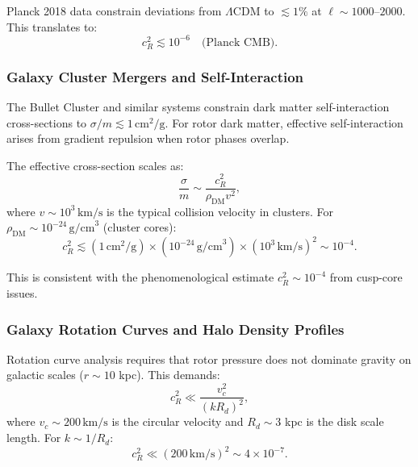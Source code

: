 \documentclass[11pt,a4paper]{article}
\numberwithin{equation}{section}
\theoremstyle{plain}
\theoremstyle{definition}
\theoremstyle{remark}
\begin{document}
Planck 2018 data constrain deviations from $\Lambda$CDM to $\lesssim 1\%$ at $\ell \sim 1000$--$2000$. This translates to:
\begin{equation}
c_R^2 \lesssim 10^{-6} \quad\text{(Planck CMB)}.
\label{eq:cmb-constraint}
\end{equation}

\subsubsection{Galaxy Cluster Mergers and Self-Interaction}

The Bullet Cluster and similar systems constrain dark matter self-interaction cross-sections to $\sigma/m \lesssim 1\,\text{cm}^2/\text{g}$. For rotor dark matter, effective self-interaction arises from gradient repulsion when rotor phases overlap.

The effective cross-section scales as:
\begin{equation}
\frac{\sigma}{m} \sim \frac{c_R^2}{\rho_{\text{DM}} v^2},
\end{equation}
where $v \sim 10^3\,\text{km/s}$ is the typical collision velocity in clusters. For $\rho_{\text{DM}} \sim 10^{-24}\,\text{g/cm}^3$ (cluster cores):
\begin{equation}
c_R^2 \lesssim (1\,\text{cm}^2/\text{g}) \times (10^{-24}\,\text{g/cm}^3) \times (10^3\,\text{km/s})^2 \sim 10^{-4}.
\label{eq:cluster-constraint}
\end{equation}

This is consistent with the phenomenological estimate $c_R^2 \sim 10^{-4}$ from cusp-core issues.

\subsubsection{Galaxy Rotation Curves and Halo Density Profiles}

Rotation curve analysis requires that rotor pressure does not dominate gravity on galactic scales ($r \sim 10$ kpc). This demands:
\begin{equation}
c_R^2 \ll \frac{v_c^2}{(kR_d)^2},
\end{equation}
where $v_c \sim 200\,\text{km/s}$ is the circular velocity and $R_d \sim 3$ kpc is the disk scale length. For $k \sim 1/R_d$:
\begin{equation}
c_R^2 \ll (200\,\text{km/s})^2 \sim 4 \times 10^{-7}.
\label{eq:rotation-constraint}
\end{equation}
\end{document}
